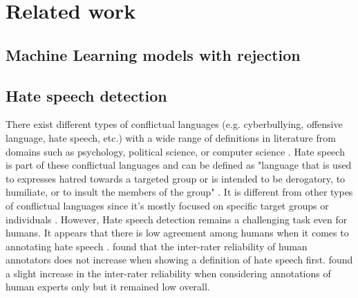 \chapter{Related work}

\section{Machine Learning models with rejection}

\section{Hate speech detection}
There exist different types of conflictual languages (e.g. cyberbullying, offensive language, hate speech, etc.) with a wide range of definitions in literature from domains such as psychology, political science, or computer science \cite{balayn2021automatic}.
%
Hate speech is part of these conflictual languages and can be defined as "language that is used to expresses hatred towards a targeted group or is intended to be derogatory, to humiliate, or to insult the members of the group" \cite{davidson2017automated, balayn2021automatic}.
%
It is different from other types of conflictual languages since it's mostly focused on specific target groups or individuals \cite{balayn2021automatic}.
%
However,
%
Hate speech detection remains a challenging task even for humans.
%
It appears that there is low agreement among humans when it comes to annotating hate speech \cite{fortuna2018survey, ross2017measuring, waseem2016you}.
%
\citet{ross2017measuring} found that the inter-rater reliability of human annotators does not increase when showing a definition of hate speech first.
%
\citet{waseem2016you} found a slight increase in the inter-rater reliability when considering annotations of human experts only but it remained low overall.
%





